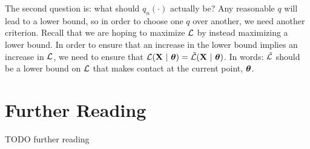 The second question is: what should $q_n(\cdot)$ actually be?  Any
reasonable $q$ will lead to a lower bound, so in order to choose one
$q$ over another, we need another criterion.  Recall that we are
hoping to maximize $\mathcal{L}$ by instead maximizing a lower bound.  In
order to ensure that an increase in the lower bound implies an
increase in $\mathcal{L}$, we need to ensure that $\mathcal{L}(\text{\bf X} \textrm{~}\arrowvert\textrm{~} {\boldsymbol{\theta}}) =
\tilde{\mathcal{L}}(\text{\bf X} \textrm{~}\arrowvert\textrm{~} {\boldsymbol{\theta}})$.  In words: $\tilde{\mathcal{L}}$ should be a lower
bound on $\mathcal{L}$ that makes contact at the current point, ${\boldsymbol{\theta}}$.







\section{Further Reading}

TODO further reading


\begin{comment}
   - Latent variable models (versus parameters)
   - Marginalization, expectations
   - Gaussian mixture models as naive Bayes without labels
   - Expectation maximization in general
   - EM vs gradient descent
   - ``hard'' em
\end{comment}



